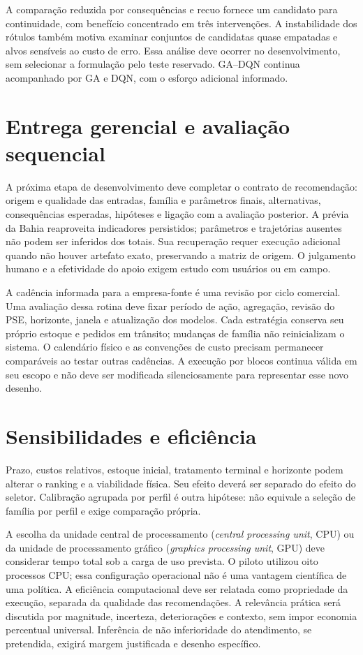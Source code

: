 A comparação reduzida por consequências e recuo fornece um candidato para continuidade, com benefício concentrado em três intervenções. A instabilidade dos rótulos também motiva examinar conjuntos de candidatas quase empatadas e alvos sensíveis ao custo de erro. Essa análise deve ocorrer no desenvolvimento, sem selecionar a formulação pelo teste reservado. GA--DQN continua acompanhado por GA e DQN, com o esforço adicional informado.

\section{Entrega gerencial e avaliação sequencial}
A próxima etapa de desenvolvimento deve completar o contrato de recomendação: origem e qualidade das entradas, família e parâmetros finais, alternativas, consequências esperadas, hipóteses e ligação com a avaliação posterior. A prévia da Bahia reaproveita indicadores persistidos; parâmetros e trajetórias ausentes não podem ser inferidos dos totais. Sua recuperação requer execução adicional quando não houver artefato exato, preservando a matriz de origem. O julgamento humano e a efetividade do apoio exigem estudo com usuários ou em campo.

A cadência informada para a empresa-fonte é uma revisão por ciclo comercial. Uma avaliação dessa rotina deve fixar período de ação, agregação, revisão do PSE, horizonte, janela e atualização dos modelos. Cada estratégia conserva seu próprio estoque e pedidos em trânsito; mudanças de família não reinicializam o sistema. O calendário físico e as convenções de custo precisam permanecer comparáveis ao testar outras cadências. A execução por blocos continua válida em seu escopo e não deve ser modificada silenciosamente para representar esse novo desenho.

\section{Sensibilidades e eficiência}
\label{sec:robustez_pooling}
Prazo, custos relativos, estoque inicial, tratamento terminal e horizonte podem alterar o ranking e a viabilidade física. Seu efeito deverá ser separado do efeito do seletor. Calibração agrupada por perfil é outra hipótese: não equivale a seleção de família por perfil e exige comparação própria.

A escolha da unidade central de processamento (\textit{central processing unit}, CPU) ou da unidade de processamento gráfico (\textit{graphics processing unit}, GPU) deve considerar tempo total sob a carga de uso prevista. O piloto utilizou oito processos CPU; essa configuração operacional não é uma vantagem científica de uma política. A eficiência computacional deve ser relatada como propriedade da execução, separada da qualidade das recomendações. A relevância prática será discutida por magnitude, incerteza, deteriorações e contexto, sem impor economia percentual universal. Inferência de não inferioridade do atendimento, se pretendida, exigirá margem justificada e desenho específico.

